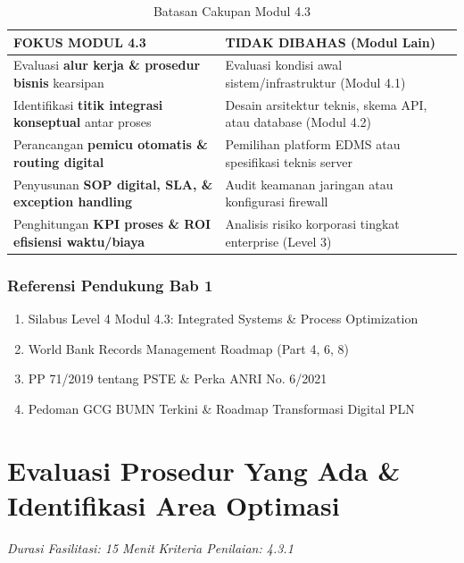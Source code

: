 \documentclass[12pt,a4paper]{report}
\begin{document}
\begin{table}[htbp]
\centering
\caption{Batasan Cakupan Modul 4.3}
\begin{tabularx}{\textwidth}{@{} >{\raggedright\arraybackslash}X >{\raggedright\arraybackslash}X @{}}
\toprule
\textbf{\color{plnblue}FOKUS MODUL 4.3} & \textbf{\color{red}TIDAK DIBAHAS (Modul Lain)} \\
\midrule
Evaluasi \textbf{alur kerja \& prosedur bisnis} kearsipan & Evaluasi kondisi awal sistem/infrastruktur (Modul 4.1) \\
Identifikasi \textbf{titik integrasi konseptual} antar proses & Desain arsitektur teknis, skema API, atau database (Modul 4.2) \\
Perancangan \textbf{pemicu otomatis \& routing digital} & Pemilihan platform EDMS atau spesifikasi teknis server \\
Penyusunan \textbf{SOP digital, SLA, \& exception handling} & Audit keamanan jaringan atau konfigurasi firewall \\
Penghitungan \textbf{KPI proses \& ROI efisiensi waktu/biaya} & Analisis risiko korporasi tingkat enterprise (Level 3) \\
\bottomrule
\end{tabularx}
\end{table}

\subsection*{Referensi Pendukung Bab 1}
\begin{enumerate}[leftmargin=*, nosep]
    \item Silabus Level 4 Modul 4.3: Integrated Systems \& Process Optimization
    \item World Bank Records Management Roadmap (Part 4, 6, 8)
    \item PP 71/2019 tentang PSTE \& Perka ANRI No. 6/2021
    \item Pedoman GCG BUMN Terkini \& Roadmap Transformasi Digital PLN
\end{enumerate}

\newpage

\chapter{Evaluasi Prosedur Yang Ada \& Identifikasi Area Optimasi}
\textit{Durasi Fasilitasi: 15 Menit} \quad \textit{Kriteria Penilaian: 4.3.1}
\end{document}
